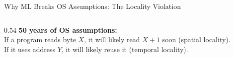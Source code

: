 \documentclass[aspectratio=169, 12pt]{beamer}
\begin{document}
\begin{frame}{Why ML Breaks OS Assumptions: The Locality Violation}
\note{
%
%
%
%
}

\footnotesize
\begin{columns}[T]
  \begin{column}{0.54\textwidth}
    \textbf{50 years of OS assumptions:}\\
    {\scriptsize If a program reads byte $X$, it will likely read $X\!+\!1$ soon (spatial locality).\\
    If it uses address $Y$, it will likely reuse it (temporal locality).}


\end{column}
\end{columns}
\end{frame}
\end{document}
